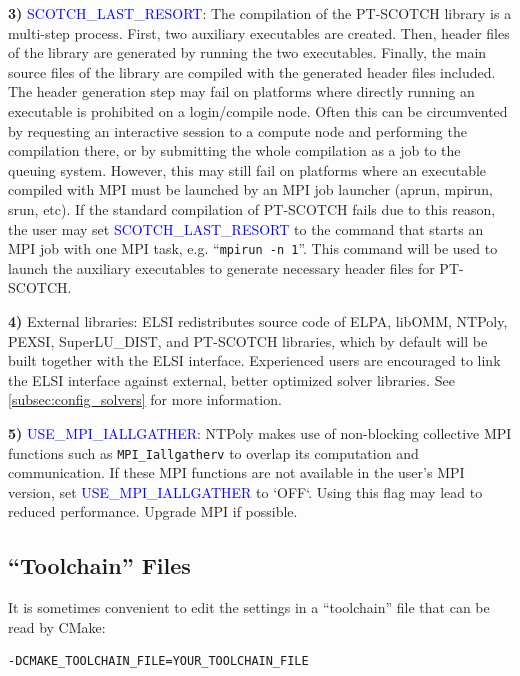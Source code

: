 \documentclass{report}
\begin{document}
\textbf{3)} \textcolor{blue}{SCOTCH\_LAST\_RESORT}: The compilation of the PT-SCOTCH library is a multi-step process. First, two auxiliary executables are created. Then, header files of the library are generated by running the two executables. Finally, the main source files of the library are compiled with the generated header files included. The header generation step may fail on platforms where directly running an executable is prohibited on a login/compile node. Often this can be circumvented by requesting an interactive session to a compute node and performing the compilation there, or by submitting the whole compilation as a job to the queuing system. However, this may still fail on platforms where an executable compiled with MPI must be launched by an MPI job launcher (aprun, mpirun, srun, etc). If the standard compilation of PT-SCOTCH fails due to this reason, the user may set \textcolor{blue}{SCOTCH\_LAST\_RESORT} to the command that starts an MPI job with one MPI task, e.g. ``\verb+mpirun -n 1+''. This command will be used to launch the auxiliary executables to generate necessary header files for PT-SCOTCH.

\textbf{4)} External libraries: ELSI redistributes source code of ELPA, libOMM, NTPoly, PEXSI, SuperLU\_DIST, and PT-SCOTCH libraries, which by default will be built together with the ELSI interface. Experienced users are encouraged to link the ELSI interface against external, better optimized solver libraries. See \ref{subsec:config_solvers} for more information.

\textbf{5)} \textcolor{blue}{USE\_MPI\_IALLGATHER}: NTPoly makes use of non-blocking collective MPI functions such as \texttt{MPI\_Iallgatherv} to overlap its computation and communication. If these MPI functions are not available in the user's MPI version, set \textcolor{blue}{USE\_MPI\_IALLGATHER} to `OFF`. Using this flag may lead to reduced performance. Upgrade MPI if possible.

\subsection{``Toolchain'' Files}
\label{subsec:config_toolchain}
It is sometimes convenient to edit the settings in a ``toolchain'' file that can be read by CMake:
\begin{tcolorbox}
\begin{verbatim}
-DCMAKE_TOOLCHAIN_FILE=YOUR_TOOLCHAIN_FILE
\end{verbatim}
\end{tcolorbox}
\end{document}
